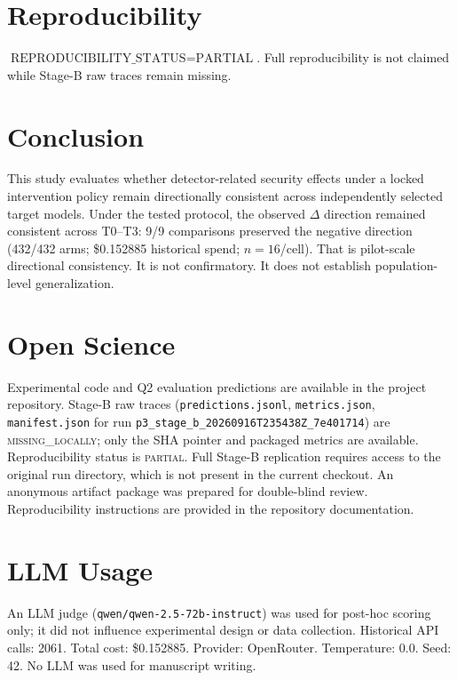 \documentclass[conference]{IEEEtran}
\begin{document}
\section{Reproducibility}
\label{sec:repro}

$\text{REPRODUCIBILITY\_STATUS} = \text{PARTIAL}$. Full reproducibility is not claimed while Stage-B raw traces remain missing.

\section{Conclusion}
\label{sec:conclusion}

This study evaluates whether detector-related security effects under a locked intervention policy remain directionally consistent across independently selected target models. Under the tested protocol, the observed $\Delta$ direction remained consistent across T0--T3: 9/9 comparisons preserved the negative direction (432/432 arms; \$0.152885 historical spend; $n=16$/cell). That is pilot-scale directional consistency. It is not confirmatory. It does not establish population-level generalization.

\section{Open Science}
\label{sec:openscience}

Experimental code and Q2 evaluation predictions are available in the project repository. Stage-B raw traces (\texttt{predictions.jsonl}, \texttt{metrics.json}, \texttt{manifest.json} for run \texttt{p3\_stage\_b\_20260916T235438Z\_7e401714}) are \textsc{missing\_locally}; only the SHA pointer and packaged metrics are available. Reproducibility status is \textsc{partial}. Full Stage-B replication requires access to the original run directory, which is not present in the current checkout. An anonymous artifact package was prepared for double-blind review. Reproducibility instructions are provided in the repository documentation.

\section{LLM Usage}
\label{sec:llmusage}

An LLM judge (\texttt{qwen/qwen-2.5-72b-instruct}) was used for post-hoc scoring only; it did not influence experimental design or data collection. Historical API calls: 2061. Total cost: \$0.152885. Provider: OpenRouter. Temperature: 0.0. Seed: 42. No LLM was used for manuscript writing.
\end{document}
